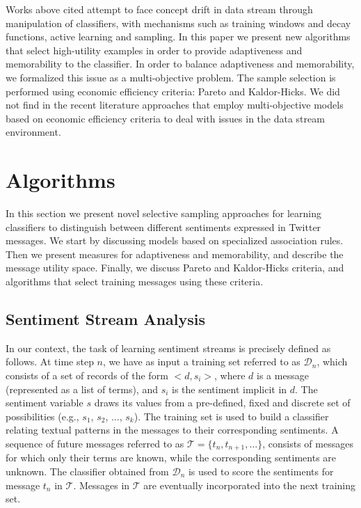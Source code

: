 \documentclass{sig-alternate}
\begin{document}
Works above cited attempt to face concept drift in data stream through manipulation of
classifiers, with mechanisms such as training windows and decay functions,
active learning and sampling. In this paper we present new algorithms that
select high-utility examples in order to provide adaptiveness and memorability
to the classifier. In order to balance adaptiveness
and memorability, we formalized this issue as a multi-objective problem. The sample
selection is performed using economic efficiency criteria: Pareto and Kaldor-Hicks.
We did not find in the recent literature
approaches that employ multi-objective models based on economic efficiency criteria to
deal with issues in the data stream environment.
\section{Algorithms}

In this section we present novel selective sampling approaches for learning classifiers to distinguish between different sentiments expressed in Twitter messages. We start by discussing models based on specialized association rules.
Then we present measures for adaptiveness and memorability, and describe the message utility space. Finally, we discuss Pareto and Kaldor-Hicks criteria, and algorithms that select training messages using these criteria.

\subsection{Sentiment Stream Analysis}

In our context, the task of learning sentiment streams is precisely defined as follows. At time step $n$, we have as input
a training set referred to as $\mathcal{D}_n$, which consists of
a set of records of the form $<d,s_i>$, where $d$ is a
message (represented as a list of terms),
and $s_i$ is the sentiment implicit in $d$.
The sentiment variable $s$ draws its values from a pre-defined, fixed and discrete set of possibilities (e.g., $s_1$,
$s_2$, $\ldots$, $s_k$).
The training set is used to build a classifier relating textual patterns in the messages to their corresponding sentiments.
A sequence of future messages referred to as $\mathcal{T}=\{t_n, t_{n+1}, \ldots\}$, consists of messages
for which only their terms are known, while the corresponding sentiments are unknown.
The classifier obtained from $\mathcal{D}_n$ is used
to score the sentiments for message $t_n$ in $\mathcal{T}$.
Messages in $\mathcal{T}$ are eventually incorporated into the next training set.
\end{document}
